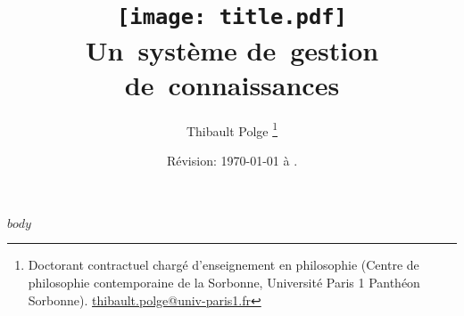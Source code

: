 \documentclass[11pt, french]{book} %
\begin{document}
\frontmatter

\title{%
\vspace{-3cm}
\texttt{[image: title.pdf]}
\\
Un~système de~gestion de~connaissances
}
\author{Thibault Polge%
\thanks{Doctorant contractuel chargé d'enseignement en philosophie (Centre de philosophie contemporaine de la Sorbonne, Université Paris 1 Panthéon Sorbonne). \href{mailto:thibault.polge@univ-paris1.fr}{\mbox{thibault.polge@univ-paris1.fr}}
}
}

\date{Révision: \today{} à \currenttime.}
\date{}

\maketitle


$body$

\renewcommand*\listtablename{Tableaux et figures}
\listoftables

%

\tableofcontents
\end{document}
